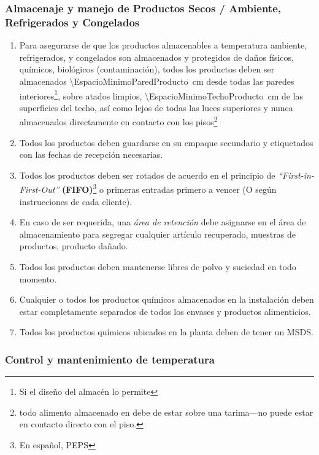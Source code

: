 \subsubsection{Almacenaje y manejo de Productos Secos / Ambiente, Refrigerados y Congelados}
\begin{enumerate}
	\item Para asegurarse de que los productos almacenables a temperatura ambiente, refrigerados, y congelados son almacenados y protegidos de daños físicos, químicos, biológicos (contaminación), todos los productos deben ser almacenados \qty{\EspacioMinimoParedProducto}{\centi\meter} desde todas las paredes interiores\footnote{Si el diseño del almacén lo permite}, sobre atados limpios, \qty{\EspacioMinimoTechoProducto}{\centi\meter} de las superficies del techo, así como lejos de todas las luces superiores y nunca almacenados directamente en contacto con los pisos\footnote{todo \gls{alimento} almacenado en  debe de estar sobre una tarima---no puede estar en contacto directo con el piso.}
	\item Todos los productos deben guardarse en su empaque secundario y etiquetados con las fechas de recepción necesarias.
	\item Todos los productos deben ser rotados de acuerdo en el principio de  \textit{“First-in-First-Out”} \textbf{(FIFO)}\footnote{En español, \gls{PEPS}} o primeras entradas primero a vencer (O según instrucciones de cada cliente).
	\item En caso de ser requerida, una \emph{área de retención} debe asignarse en el área de almacenamiento para segregar cualquier artículo recuperado, muestras de productos, producto dañado. 
	\item Todos los productos deben mantenerse libres de polvo y suciedad en todo momento.
	\item Cualquier o todos los productos químicos almacenados en la instalación deben estar completamente separados de todos los envases y productos alimenticios.
	\item Todos los productos químicos ubicados en la planta deben de tener un MSDS.
\end{enumerate}

\subsubsection{Control y mantenimiento de temperatura}

